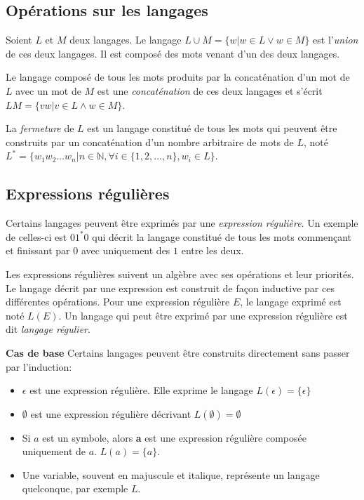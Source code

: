 \subsection{Opérations sur les langages}

Soient $L$ et $M$ deux langages. Le langage $L \cup M = \{w | w \in L\vee w \in M\}$ est l'\emph{union} de ces deux langages. Il est composé des mots venant d'un des deux langages.

Le langage composé de tous les mots produits par la concaténation d'un mot de $L$ avec un mot de $M$ est une \emph{concaténation} de ces deux langages et s'écrit $LM = \{vw | v \in L \wedge w \in M\}$.

La \emph{fermeture} de $L$ est un langage constitué de tous les mots qui peuvent être construits par un concaténation d'un nombre arbitraire de mots de $L$, noté $L^*=\{w_1w_2\dots w_n|n\in \mathbb{N},\forall i \in \{1,2,\dots,n\}, w_i \in L\}$.


\subsection{Expressions régulières}

Certains langages peuvent être exprimés par une \emph{expression régulière}. Un exemple de celles-ci est $01^*0$ qui décrit la langage constitué de tous les mots commençant et finissant par $0$ avec uniquement des $1$ entre les deux.

Les expressions régulières suivent un algèbre avec ses opérations et leur priorités. Le langage décrit par une expression est construit de façon inductive par ces différentes opérations. Pour une expression régulière $E$, le langage exprimé est noté $L(E)$. Un langage qui peut être exprimé par une expression régulière est dit \emph{langage régulier}.


\textbf{Cas de base}
Certains langages peuvent être construits directement sans passer par l'induction:

\begin{itemize}
	\item $\epsilon$ est une expression régulière. Elle exprime le langage $L(\epsilon)=\{\epsilon\}$
	\item $\emptyset$ est une expression régulière décrivant $L(\emptyset)=\emptyset$
	\item Si $a$ est un symbole, alors \textbf{a} est une expression régulière composée uniquement de $a$. $L(a) = \{a\}$.
	\item Une variable, souvent en majuscule et italique, représente un langage quelconque, par exemple $L$.
\end{itemize}


